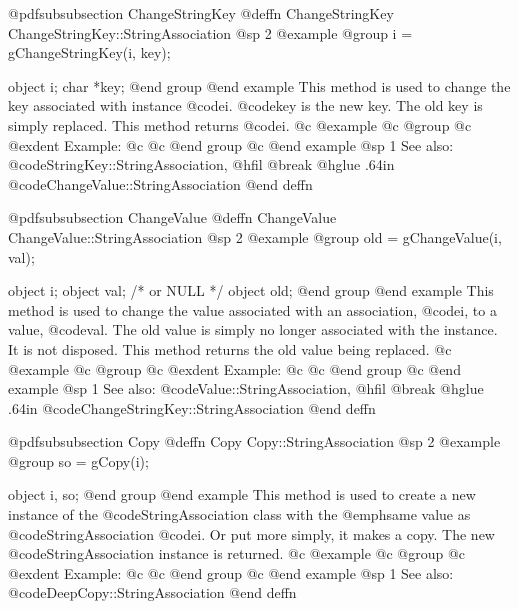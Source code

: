 @pdfsubsubsection {ChangeStringKey}
@deffn {ChangeStringKey} ChangeStringKey::StringAssociation
@sp 2
@example
@group
i = gChangeStringKey(i, key);

object  i;
char    *key;
@end group
@end example
This method is used to change the key associated with instance @code{i}.
@code{key} is the new key.  The old key is simply replaced.  This method
returns @code{i}.
@c @example
@c @group
@c @exdent Example:
@c 
@c @end group
@c @end example
@sp 1
See also:  @code{StringKey::StringAssociation,}
@hfil @break @hglue .64in      @code{ChangeValue::StringAssociation}
@end deffn











@pdfsubsubsection {ChangeValue}
@deffn {ChangeValue} ChangeValue::StringAssociation
@sp 2
@example
@group
old = gChangeValue(i, val);

object  i;
object  val;    /*  or NULL   */
object  old;
@end group
@end example
This method is used to change the value associated with an association,
@code{i}, to a value, @code{val}.  The old value is simply no longer
associated with the instance.  It is not disposed.  This method
returns the old value being replaced.
@c @example
@c @group
@c @exdent Example:
@c 
@c @end group
@c @end example
@sp 1
See also:  @code{Value::StringAssociation,}
@hfil @break @hglue .64in      @code{ChangeStringKey::StringAssociation}
@end deffn















@pdfsubsubsection {Copy}
@deffn {Copy} Copy::StringAssociation
@sp 2
@example
@group
so = gCopy(i);

object  i, so;
@end group
@end example
This method is used to create a new instance of the
@code{StringAssociation} class with the @emph{same} value as
@code{StringAssociation} @code{i}.  Or put more simply, it makes a copy.
The new @code{StringAssociation} instance is returned.
@c @example
@c @group
@c @exdent Example:
@c 
@c @end group
@c @end example
@sp 1
See also:  @code{DeepCopy::StringAssociation}
@end deffn













